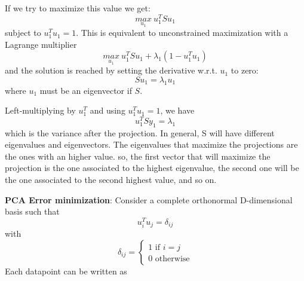 If we try to maximize this value we get:
\begin{equation}
    \underset{u_{1}}{max}\ u_{1}^{T}Su_{1}
\end{equation}
subject to $u_{1}^{T}u_{1} = 1$. This is equivalent to unconstrained maximization with a Lagrange multiplier
\begin{equation}
    \underset{u_{1}}{max}\ u_{1}^{T}Su_{1} + \lambda_{1}(1 - u_{1}^{T}u_{1})
\end{equation}
and the solution is reached by setting the derivative w.r.t. $u_{1}$ to zero:
\begin{equation}
    Su_{1} = \lambda_{1}u_{1}
\end{equation}
where $u_{1}$ must be an eigenvector if $S$.

Left-multiplying by $u_{1}^{T}$ and using $u_{1}^{T}u_{1} = 1$, we have
\begin{equation}
    u_{1}^{T}Sy_{1} = \lambda_{1}
\end{equation}
which is the variance after the projection. In general, S will have different eigenvalues and eigenvectors. The eigenvalues that maximize the projections are the ones with an higher value. so, the first vector that will maximize the projection is the one associated to the highest eigenvalue, the second one will be the one associated to the second highest value, and so on.

\textbf{PCA Error minimization}: Consider a complete orthonormal D-dimensional basis such that
\begin{equation}
    u_{i}^{T}u_{j} = \delta_{ij}
\end{equation}
with
\begin{equation}
    \delta_{ij} =
    \begin{cases}
      1 \text{ if } i = j\\
      0 \text{ otherwise}
    \end{cases}
\end{equation}
Each datapoint can be written as 


